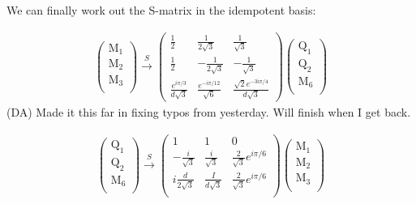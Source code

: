 \documentclass[12pt,a4paper]{article}
\newcounter{arrow}
\newcommand{\dave}[1]{{\color{ao(english)}\footnotesize{(DA) #1}}}
\begin{document}
We can finally work out the S-matrix in the idempotent basis:

\begin{align}\left( \begin{matrix}
\text{M}_1\\
\text{M}_2\\
\text{M}_3\\
\end{matrix} \right)
\xrightarrow{S}
\left( \begin{matrix}
\frac{1}{2} & \frac{1}{2\sqrt{3}} &  \frac{1}{\sqrt{3}} \\
\frac{1}{2} & - \frac{1}{2\sqrt{3}} & -\frac{1}{\sqrt{3}} \\
\frac{e^{ i \pi /3}}{d \sqrt{3}} & \frac{e^{- i \pi /12}}{\sqrt{6}} & \frac{\sqrt{2}e^{-3i \pi /4}}{d \sqrt{3}}
\end{matrix} \right)
\left( \begin{matrix}
\text{Q}_1\\
\text{Q}_2\\
\text{M}_6\\
\end{matrix} \right)
\end{align}
\dave{Made it this far in fixing typos from yesterday. Will finish when I get back.}

\begin{align}
\left( \begin{matrix}
\text{Q}_1\\
\text{Q}_2\\
\text{M}_6\\
\end{matrix} \right)
\xrightarrow{S}
\left( \begin{matrix}
1& 1& 0 \\
- \frac{i}{\sqrt{3}} & \frac{i}{\sqrt{3}} & \frac{2}{\sqrt{3}} e^{i \pi/6} \\
i \frac{d}{2 \sqrt{3}} & \frac{I}{d \sqrt{3}} & \frac{2}{\sqrt{3}} e^{i \pi /6} \\
\end{matrix} \right)
\left( \begin{matrix}
\text{M}_1\\
\text{M}_2\\
\text{M}_3\\
\end{matrix} \right)
\end{align}
\end{document}
